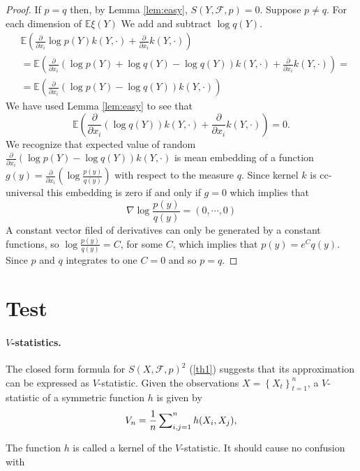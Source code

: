 \documentclass{article}
\newcommand{\ev}{\mathbb{E}}
\begin{document}
\begin{proof}
If $p=q$ then, by Lemma \ref{lem:easy}, $S(Y,\mathcal{F},p) = 0$. Suppose $p \neq q$. For each dimension of $\ev \xi(Y)$ We add and subtract $\log q(Y)$.  
\begin{align*}
 &\ev \left( \frac{\partial } {\partial x_i} \log p(Y) k(Y,\cdot) + \frac{\partial } {\partial x_i} k(Y,\cdot)  \right) \\
 &=\ev \left( \frac{\partial } {\partial x_i} ( \log  p(Y) + \log  q(Y)- \log  q(Y)  )  k(Y,\cdot)   + \frac{\partial } {\partial x_i} k(Y,\cdot) \right) = \\
 &= \ev \left(  \frac{\partial } {\partial x_i} (\log p(Y) - \log q(Y))k(Y,\cdot) \right) 
\end{align*}
We have used Lemma \ref{lem:easy} to see that 
\[
\ev \left( \frac{\partial } {\partial x_i} (  \log  q(Y)  )  k(Y,\cdot)   + \frac{\partial } {\partial x_i} k(Y,\cdot) \right) =0.
\]
We recognize that expected value of random  $ \frac{\partial } {\partial x_i} (\log p(Y) - \log q(Y))  k(Y,\cdot)$ is mean embedding  of a function $g(y) =  \frac{\partial } {\partial x_i} (\log \frac{p(y)}{q(y)})$  with respect to  the measure $q$. Since kernel $k$ is cc-universal this embedding is zero if and only if $g = 0$ which implies that 
\[
 \nabla \log \frac{p(y)}{q(y)} = (0,\cdots ,0)
\]
A constant vector filed of derivatives  can only be generated by a constant functions, so $\log \frac{p(y)}{q(y)} =C$, for some $C$, which implies that  $p(y) = e^C q(y)$. Since $p$ and $q$ integrates to one $C=0$ and so $p=q$.
\end{proof}



\section{Test}

\paragraph{$V$-statistics.} The closed form formula for $S(X,\mathcal{F},p)^2$ (\ref{th1}) suggests that its approximation can be expressed as $V$-statistic. Given the observations $X=\left\{X_t\right\}_{t=1}^n$, a $V$-statistic of a symmetric function $h$ is given by 
\begin{equation}
\label{def:Vstat}
V_n = \frac{1}{n} \sum_{i,j=1}^n \nolimits h(X_i,X_j),
\end{equation}


The function $h$ is called a kernel of the $V$-statistic. It should cause no confusion with  
\end{document}
